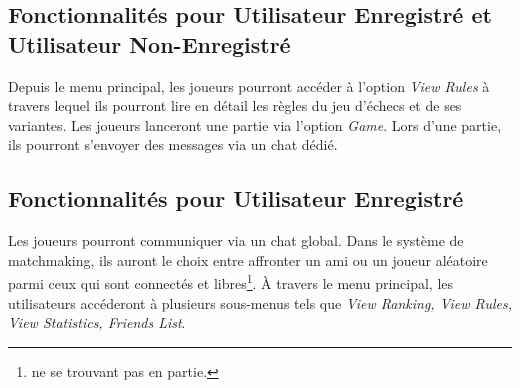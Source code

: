 \documentclass[10pt, a4paper]{article}
\begin{document}
			\subsection{Fonctionnalités pour Utilisateur Enregistré et Utilisateur Non-Enregistré}Depuis le menu principal, les joueurs pourront accéder à l'option {\itshape View Rules} à travers lequel ils pourront lire en détail les règles du jeu d'échecs et de ses variantes. Les joueurs lanceront une partie via l'option {\itshape Game}. Lors d'une partie, ils pourront s'envoyer des messages via un chat dédié.

			\subsection{Fonctionnalités pour Utilisateur Enregistré}Les joueurs pourront communiquer via un chat global. Dans le système de matchmaking, ils auront le choix entre affronter un ami ou un joueur aléatoire parmi ceux qui sont connectés et libres\footnote{ne se trouvant pas en partie.}. À travers le menu principal, les utilisateurs accéderont à plusieurs sous-menus tels que {\itshape View Ranking, View Rules, View Statistics, Friends List}.%
\end{document}
